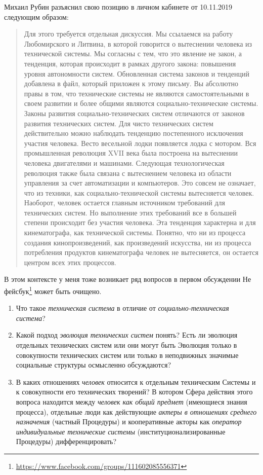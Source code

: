 \documentclass[11pt,a4paper]{article}
\begin{document}
Михаил Рубин разъяснил свою позицию в личном кабинете от 10.11.2019 следующим
образом:
\begin{quote}
  Для этого требуется отдельная дискуссия. Мы ссылаемся на работу Любомирского
  и Литвина, в которой говорится о вытеснении человека из технической системы.
  Мы согласны с тем, что это явление не закон, а тенденция, которая происходит
  в рамках другого закона: повышения уровня автономности систем. Обновленная
  система законов и тенденций добавлена в файл, который приложен к этому
  письму.  Вы абсолютно правы в том, что технические системы не являются
  самостоятельными в своем развитии и более общими являются
  социально-технические системы. Законы развития социально-технических систем
  отличаются от законов развития технических систем. Для чисто технических
  систем действительно можно наблюдать тенденцию постепенного исключения
  участия человека. Весто весельной лодки появляется лодка с мотором. Вся
  промышленная революция XVII века была построена на вытеснении человека
  двигателями и машинами. Следующая технологическая революция также была
  связана с вытеснением человека из области управления за счет автоматизации и
  компьютеров. Это совсем не означает, что из техники, как
  социально-технической системы вытесняется человек. Наоборот, человек
  остается главным источником требований для технических систем. Но выполнение
  этих требований все в большей степени происходит без участия человека. Эта
  тенденция характерна и для кинематографа, как технической системы. Понятно,
  что ни из процесса создания кинопроизведений, как произведений искусства, ни
  из процесса потребления продуктов кинематографа человек не вытесняется, он
  остается центром всех этих процессов. 
\end{quote}
В этом контексте у меня тоже возникает ряд вопросов в первом обсуждении Не
фейсбук\footnote{\url{https://www.facebook.com/groups/111602085556371}} может
быть очищено.
\begin{enumerate}
\item Что такое \emph{техническая система} в отличие от
  \emph{социально-техническая система}?
\item Какой подход \emph{эволюция технических систем} понять?  Есть ли
  эволюция отдельных технических систем или они могут быть Эволюция только в
  совокупности технических систем или только в неподвижных значимые социальные
  структуры осмысленно обсуждаются?
\item В каких отношениях \emph{человек} относится к отдельным техническим
  Системы и к совокупности его технических творений? В котором Сфера действия
  этого вопроса находится между \emph{человек как общий предмет} (имеющиеся
  знания процесса), отдельные люди как действующие \emph{актеры в отношениях
    среднего назначения} (частный Процедуры) и кооперативные акторы как
  \emph{оператор индивидуальные технические системы} (институционализированные
  Процедуры) дифференцировать?
\end{enumerate}
\end{document}

